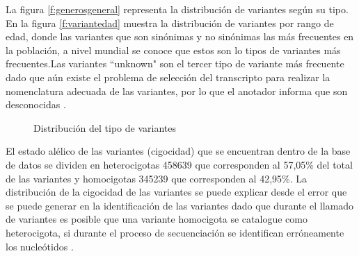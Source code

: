 La figura \ref{f:generosgeneral} representa la distribución de variantes según su tipo. En la figura \ref{f:variantedad} muestra la distribución  de variantes por rango de edad, donde las variantes que son sinónimas y no sinónimas las más frecuentes en la población, a  nivel mundial se conoce que estos son lo tipos de variantes más frecuentes\cite{Fu2013}.Las variantes ``unknown"  son el tercer tipo de variante más frecuente dado que aún existe el problema de selección del transcripto para realizar la nomenclatura adecuada de las variantes, por lo que el anotador informa que son desconocidas \cite{McCarthy2014}.\\

\begin{figure}[H]
	\centering
	\caption{Distribución del tipo de variantes}
	\label{f:variantesgeneral}
\end{figure}


El estado alélico de las variantes (cigocidad) que se encuentran dentro de la base de datos se dividen en heterocigotas 458639 que corresponden al 57,05\% del total de las variantes  y homocigotas 345239 que corresponden al 42,95\%. La distribución de la cigocidad de las variantes se puede explicar desde el error que se puede generar en la identificación de las variantes dado que durante el llamado  de variantes es posible que una variante homocigota se catalogue como heterocigota, si durante el proceso de secuenciación se identifican erróneamente los nucleótidos \cite{Babraham2016}\cite{Pirooznia2014}. 

